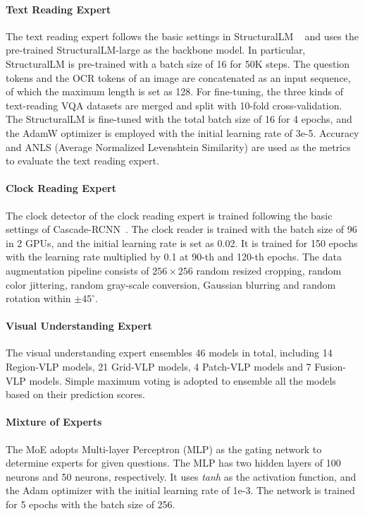 \paragraph{Text Reading Expert} The text reading expert follows the basic settings in StructuralLM ~\citep{structurallm} and uses the pre-trained StructuralLM-large as the backbone model. In particular, StructuralLM is pre-trained with a batch size of 16 for 50K steps. The question tokens and the OCR tokens of an image are concatenated as an input sequence, of which the maximum length is set as 128. For fine-tuning, the three kinds of text-reading VQA datasets are merged and split with 10-fold cross-validation. The StructuralLM is fine-tuned with the total batch size of 16 for 4 epochs, and the AdamW optimizer is employed with the initial learning rate of 3e-5. Accuracy and ANLS (Average Normalized Levenshtein Similarity) are used as the metrics to evaluate the text reading expert.

\paragraph{Clock Reading Expert}
The clock detector of the clock reading expert is trained following the basic settings of Cascade-RCNN~\citep{cai2018cascade}. The clock reader is trained with the batch size of 96 in 2 GPUs, and the initial learning rate is set as 0.02. It is trained for 150 epochs with the learning rate multiplied by 0.1 at 90-th and 120-th epochs. The data augmentation pipeline consists of $256 \times 256$ random resized cropping, random color jittering, random gray-scale conversion, Gaussian blurring and random rotation within $\pm 45^{\circ}$.
        

\paragraph{Visual Understanding Expert} The visual understanding expert ensembles 46 models in total, including 14 Region-VLP models, 21 Grid-VLP models, 4 Patch-VLP models and 7 Fusion-VLP models. Simple maximum voting is adopted to ensemble all the models based on their prediction scores.

\paragraph{Mixture of Experts} The MoE adopts Multi-layer Perceptron (MLP) as the gating network to determine experts for given questions. The MLP has two hidden layers of 100 neurons and 50 neurons, respectively. It uses \emph{tanh} as the activation function, and the Adam optimizer with the initial learning rate of 1e-3. The network is trained for 5 epochs with the batch size of 256.



